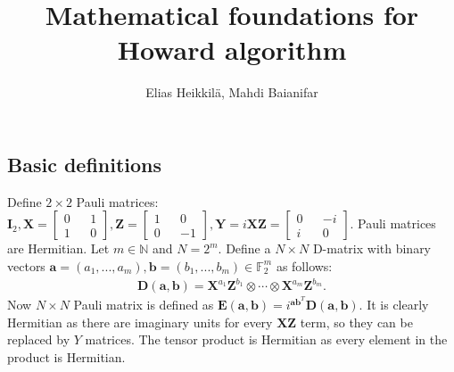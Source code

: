 \documentclass{article}
\title{Mathematical foundations for Howard algorithm}
\author{Elias Heikkilä, Mahdi Baianifar}
\date{}
\begin{document}
	\maketitle
	\subsection*{Basic definitions}
	Define $2 \times 2$ Pauli matrices: $\mathbf{I}_2, \mathbf{X} = \begin{bmatrix} 0 && 1 \\ 1 && 0 \end{bmatrix}, \mathbf{Z} = \begin{bmatrix} 1 && 0 \\ 0 && -1 \end{bmatrix}, \mathbf{Y} = i\mathbf{X}\mathbf{Z} = \begin{bmatrix} 0 && -i \\ i && 0 \end{bmatrix}$. Pauli matrices are Hermitian.
	Let $m \in \mathbb{N}$ and $N = 2^m$. Define a $N \times N$ D-matrix with binary vectors $\mathbf{a} = (a_1, ..., a_m), \mathbf{b} = (b_1,..., b_m) \in \mathbb{F}_2^m$ as follows:
	\begin{align*}
		\mathbf{D}(\mathbf{a}, \mathbf{b}) = \mathbf{X}^{a_1}\mathbf{Z}^{b_1} \otimes \cdots \otimes \mathbf{X}^{a_m}\mathbf{Z}^{b_m}.
	\end{align*}
	Now $N \times N$ Pauli matrix is defined as $\mathbf{E}(\mathbf{a}, \mathbf{b}) = i^{\mathbf{a}\mathbf{b}^T}\mathbf{D}(\mathbf{a}, \mathbf{b})$. It is clearly Hermitian as there are imaginary units for every $\mathbf{XZ}$ term, so they can be replaced by $Y$ matrices. The tensor product is Hermitian as every element in the product is Hermitian.
\end{document}
